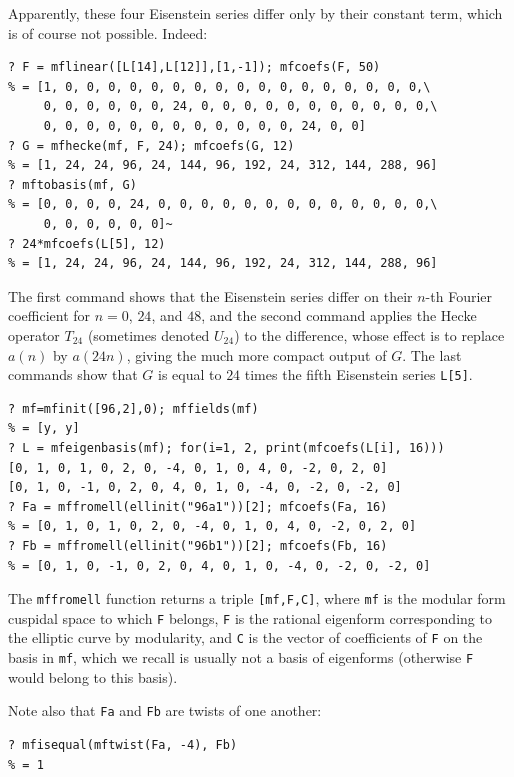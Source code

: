 \documentclass[11pt]{article}
\def\kbd#1{{\tt #1}}
\begin{document}
Apparently, these four Eisenstein series differ only by their constant
term, which is of course not possible. Indeed:

\begin{verbatim}
? F = mflinear([L[14],L[12]],[1,-1]); mfcoefs(F, 50)
% = [1, 0, 0, 0, 0, 0, 0, 0, 0, 0, 0, 0, 0, 0, 0, 0, 0, 0,\
     0, 0, 0, 0, 0, 0, 24, 0, 0, 0, 0, 0, 0, 0, 0, 0, 0, 0,\
     0, 0, 0, 0, 0, 0, 0, 0, 0, 0, 0, 0, 24, 0, 0]
? G = mfhecke(mf, F, 24); mfcoefs(G, 12)
% = [1, 24, 24, 96, 24, 144, 96, 192, 24, 312, 144, 288, 96]
? mftobasis(mf, G)
% = [0, 0, 0, 0, 24, 0, 0, 0, 0, 0, 0, 0, 0, 0, 0, 0, 0, 0,\
     0, 0, 0, 0, 0, 0]~
? 24*mfcoefs(L[5], 12)
% = [1, 24, 24, 96, 24, 144, 96, 192, 24, 312, 144, 288, 96]
\end{verbatim}

The first command shows that the Eisenstein series differ on their $n$-th
Fourier coefficient for $n=0$, $24$, and $48$, and the second command applies
the Hecke operator $T_{24}$ (sometimes denoted $U_{24}$) to the difference,
whose effect is to replace $a(n)$ by $a(24n)$, giving the much more
compact output of $G$. The last commands show that $G$ is equal to
$24$ times the fifth Eisenstein series \kbd{L[5]}.

\begin{verbatim}
? mf=mfinit([96,2],0); mffields(mf)
% = [y, y]
? L = mfeigenbasis(mf); for(i=1, 2, print(mfcoefs(L[i], 16)))
[0, 1, 0, 1, 0, 2, 0, -4, 0, 1, 0, 4, 0, -2, 0, 2, 0]
[0, 1, 0, -1, 0, 2, 0, 4, 0, 1, 0, -4, 0, -2, 0, -2, 0]
? Fa = mffromell(ellinit("96a1"))[2]; mfcoefs(Fa, 16)
% = [0, 1, 0, 1, 0, 2, 0, -4, 0, 1, 0, 4, 0, -2, 0, 2, 0]
? Fb = mffromell(ellinit("96b1"))[2]; mfcoefs(Fb, 16)
% = [0, 1, 0, -1, 0, 2, 0, 4, 0, 1, 0, -4, 0, -2, 0, -2, 0]
\end{verbatim}

The \kbd{mffromell} function returns a triple \kbd{[mf,F,C]},
where \kbd{mf} is the modular form cuspidal space to which \kbd{F} belongs,
\kbd{F} is the rational eigenform corresponding to the elliptic curve by
modularity, and \kbd{C} is the vector of coefficients of \kbd{F} on the
basis in \kbd{mf}, which we recall is usually not a basis of eigenforms
(otherwise \kbd{F} would belong to this basis).

Note also that \kbd{Fa} and \kbd{Fb} are twists of one another:

\begin{verbatim}
? mfisequal(mftwist(Fa, -4), Fb)
% = 1
\end{verbatim}
\end{document}
